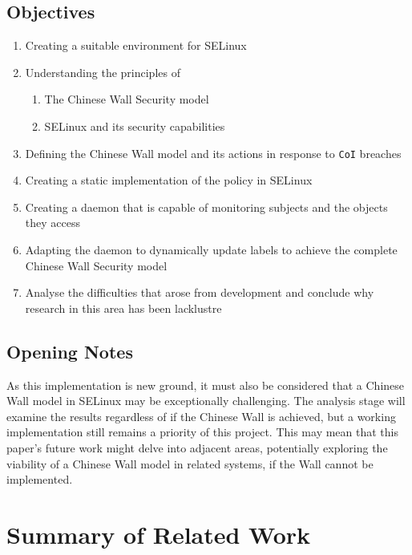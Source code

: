 \documentclass[11pt,titlepage,dvipsnames,table,xcdraw]{article}
\begin{document}
\subsection{Objectives}
\begin{enumerate}[label=1.\arabic*]
  \item Creating a suitable environment for SELinux
  \item Understanding the principles of
    \begin{enumerate}[label=1.2.\arabic*]
    \item The Chinese Wall Security model
    \item SELinux and its security capabilities
  \end{enumerate}
  \item Defining the Chinese Wall model and its actions in response to \verb_CoI_ breaches
  \item Creating a static implementation of the policy in SELinux
  \item Creating a daemon that is capable of monitoring subjects and the objects they access
  \item Adapting the daemon to dynamically update labels to achieve the complete Chinese Wall Security model
  \item Analyse the difficulties that arose from development and conclude why research in this area has been lacklustre
\end{enumerate}

\subsection{Opening Notes}
As this implementation is new ground, it must also be considered that a Chinese Wall model in SELinux may be exceptionally challenging. The analysis stage will examine the results regardless of if the Chinese Wall is achieved, but a working implementation still remains
a priority of this project. This may mean that this paper's future work might delve into adjacent areas, potentially exploring the
viability of a Chinese Wall model in related systems, if the Wall cannot be implemented.

\clearpage

\section{Summary of Related Work}
\end{document}
